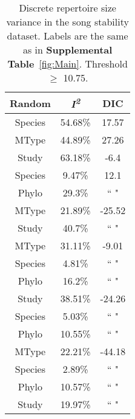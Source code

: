\documentclass{article}
\begin{document}
  \begin{table}[H]
  \centering
  \caption{Discrete repertoire size variance in the song stability dataset. Labels are the same as in \textbf{Supplemental Table}~\ref{fig:Main}. Threshold $\ge$ 10.75.} 
  \begin{tabular}{ccc}
  \hline
  Random & \textit{I\textsuperscript{2}} & DIC \\ 
  \hline
  Species & 54.68\% & 17.57 \\ \hdashline
  MType & 44.89\% & 27.26 \\ \hdashline
  Study & 63.18\% & -6.4 \\ \hdashline
  Species & 9.47\% & 12.1 \\ 
  Phylo & 29.3\% & `` " \\ \hdashline
  MType & 21.89\% & -25.52 \\ 
  Study & 40.7\% & `` " \\ \hdashline
  MType & 31.11\% & -9.01 \\ 
  Species & 4.81\% & `` " \\ 
  Phylo & 16.2\% & `` " \\ \hdashline
  Study & 38.51\% & -24.26 \\ 
  Species & 5.03\% & `` " \\ 
  Phylo & 10.55\% & `` " \\ \hdashline
  MType & 22.21\% & -44.18 \\ 
  Species & 2.89\% & `` " \\ 
  Phylo & 10.57\% & `` " \\ 
  Study & 19.97\% & `` " \\ 
  \hline
  \end{tabular}
  \end{table}
\end{document}
